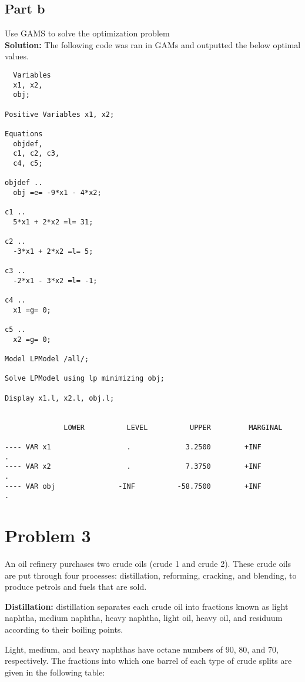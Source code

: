\documentclass[11pt]{article}
\begin{document}
\subsection{Part b}
Use GAMS to solve the optimization problem
\\
\textbf{Solution: } The following code was ran in GAMs and outputted the below optimal values.
\begin{verbatim}
  Variables
  x1, x2,  
  obj;      

Positive Variables x1, x2;

Equations
  objdef,   
  c1, c2, c3,
  c4, c5;

objdef .. 
  obj =e= -9*x1 - 4*x2;  

c1 .. 
  5*x1 + 2*x2 =l= 31;  

c2 .. 
  -3*x1 + 2*x2 =l= 5;  

c3 .. 
  -2*x1 - 3*x2 =l= -1;  

c4 .. 
  x1 =g= 0;  

c5 .. 
  x2 =g= 0;  

Model LPModel /all/; 

Solve LPModel using lp minimizing obj;  

Display x1.l, x2.l, obj.l;  


              LOWER          LEVEL          UPPER         MARGINAL

---- VAR x1                  .             3.2500        +INF             .          
---- VAR x2                  .             7.3750        +INF             .          
---- VAR obj               -INF          -58.7500        +INF             .          
\end{verbatim}

\section{Problem 3}
An oil refinery purchases two crude oils (crude 1 and crude 2). These crude oils are put through four processes: distillation, reforming, cracking, and blending, to produce petrols and fuels that are sold.

\textbf{Distillation:} distillation separates each crude oil into fractions known as light naphtha, medium naphtha, heavy naphtha, light oil, heavy oil, and residuum according to their boiling points.

Light, medium, and heavy naphthas have octane numbers of 90, 80, and 70, respectively. The fractions into which one barrel of each type of crude splits are given in the following table:
\end{document}
